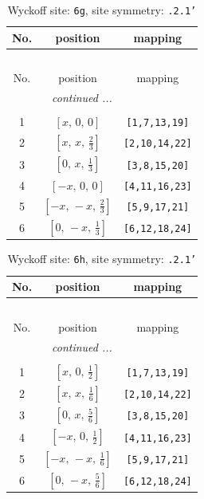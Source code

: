 \documentclass[fleqn,8pt]{jsarticle}
\begin{document}
\renewcommand{\arraystretch}{1.2}
\begin{longtable}{ccc}
\caption{Wyckoff site: {\tt 6g}, site symmetry: {\tt .2.1'}}
 \\
 \hline \hline
No. & position & mapping \\ \hline \endfirsthead

\multicolumn{2}{l}{\tablename\ \thetable{}} \\
 \hline \hline
No. & position & mapping \\ \hline \endhead

 \hline \hline
\multicolumn{2}{r}{\footnotesize\it continued ...} \\ \endfoot

 \hline \hline
\multicolumn{2}{r}{} \\ \endlastfoot

1 & $\left[ x,\, 0,\, 0 \right]$ & {\tt [1,7,13,19]} \\ \hline
2 & $\left[ x,\, x,\, \frac{2}{3} \right]$ & {\tt [2,10,14,22]} \\ \hline
3 & $\left[ 0,\, x,\, \frac{1}{3} \right]$ & {\tt [3,8,15,20]} \\ \hline
4 & $\left[ - x,\, 0,\, 0 \right]$ & {\tt [4,11,16,23]} \\ \hline
5 & $\left[ - x,\, - x,\, \frac{2}{3} \right]$ & {\tt [5,9,17,21]} \\ \hline
6 & $\left[ 0,\, - x,\, \frac{1}{3} \right]$ & {\tt [6,12,18,24]} \\
\end{longtable}
\renewcommand{\arraystretch}{1.2}
\begin{longtable}{ccc}
\caption{Wyckoff site: {\tt 6h}, site symmetry: {\tt .2.1'}}
 \\
 \hline \hline
No. & position & mapping \\ \hline \endfirsthead

\multicolumn{2}{l}{\tablename\ \thetable{}} \\
 \hline \hline
No. & position & mapping \\ \hline \endhead

 \hline \hline
\multicolumn{2}{r}{\footnotesize\it continued ...} \\ \endfoot

 \hline \hline
\multicolumn{2}{r}{} \\ \endlastfoot

1 & $\left[ x,\, 0,\, \frac{1}{2} \right]$ & {\tt [1,7,13,19]} \\ \hline
2 & $\left[ x,\, x,\, \frac{1}{6} \right]$ & {\tt [2,10,14,22]} \\ \hline
3 & $\left[ 0,\, x,\, \frac{5}{6} \right]$ & {\tt [3,8,15,20]} \\ \hline
4 & $\left[ - x,\, 0,\, \frac{1}{2} \right]$ & {\tt [4,11,16,23]} \\ \hline
5 & $\left[ - x,\, - x,\, \frac{1}{6} \right]$ & {\tt [5,9,17,21]} \\ \hline
6 & $\left[ 0,\, - x,\, \frac{5}{6} \right]$ & {\tt [6,12,18,24]} \\
\end{longtable}
\end{document}

